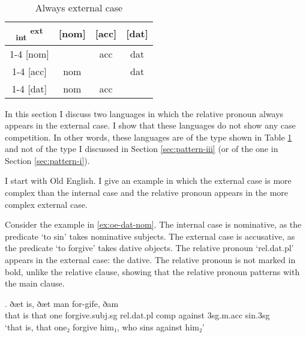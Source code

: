 \begin{table}[H]
  \center
  \caption{Always external case}
  \begin{tabular}{c|c|c|c}
    \toprule
   \textsubscript{\ac{int}} \textsuperscript{\ac{ext}}
          & [\ac{nom}]
          & [\ac{acc}]
          & [\ac{dat}]
          \\ \cmidrule{1-4}
      [\ac{nom}]
          & \xcancel{\phantom{xx}}
          & \ac{acc}
          & \ac{dat}
          \\ \cmidrule{1-4}
      [\ac{acc}]
          & \ac{nom}
          & \xcancel{\phantom{xx}}
          & \ac{dat}
          \\ \cmidrule{1-4}
      [\ac{dat}]
          & \ac{nom}
          & \ac{acc}
          & \xcancel{\phantom{xx}}
          \\
    \bottomrule
  \end{tabular}
  \label{tbl:no-case-competition-ext}
\end{table}

In this section I discuss two languages in which the relative pronoun always appears in the external case. I show that these languages do not show any case competition. In other words, these languages are of the type shown in Table \ref{tbl:no-case-competition-ext} and not of the type I discussed in Section \ref{sec:pattern-iii} (or of the one in Section \ref{sec:pattern-i}).

I start with Old English. I give an example in which the external case is more complex than the internal case and the relative pronoun appears in the more complex external case.

Consider the example in \ref{ex:oe-dat-nom}.
The internal case is nominative, as the predicate  `to sin' takes nominative subjects.
The external case is accusative, as the predicate  `to forgive' takes dative objects.
The relative pronoun  `\ac{rel}.\ac{dat}.\ac{pl}' appears in the external case: the dative. The relative pronoun is not marked in bold, unlike the relative clause, showing that the relative pronoun patterns with the main clause.

\exg. ðæt is, ðæt man for-gife, ðam    \\
 that is that one forgive.\ac{subj}.\ac{sg}\scsub{[dat]} \ac{rel}.\ac{dat}.\ac{pl} \ac{comp} against 3\ac{sg}.\ac{m}.\ac{acc} sin.3\ac{sg}\scsub{[nom]}\\
 `that is, that one₂ forgive him₁, who sins against him₂'  \label{ex:oe-dat-nom}

